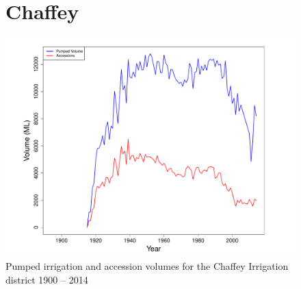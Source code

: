 \documentclass[a4paper, titlepage, 12pt]{article}\usepackage[]{graphicx}\usepackage[]{color}
\newenvironment{knitrout}{}{} %
\begin{document}
\begin{sffamily}
\begin{appendices}
\begin{figure}
\section{Chaffey}
\begin{knitrout}
\color{fgcolor}
\includegraphics[width=0.95	extwidth]{../figures/Chaffey-1} 

\end{knitrout}
\caption{Pumped irrigation and accession volumes for the Chaffey Irrigation district 1900 -- 2014}
\label{fig03}
\end{figure}
\end{appendices}


\end{sffamily}
\end{document}
